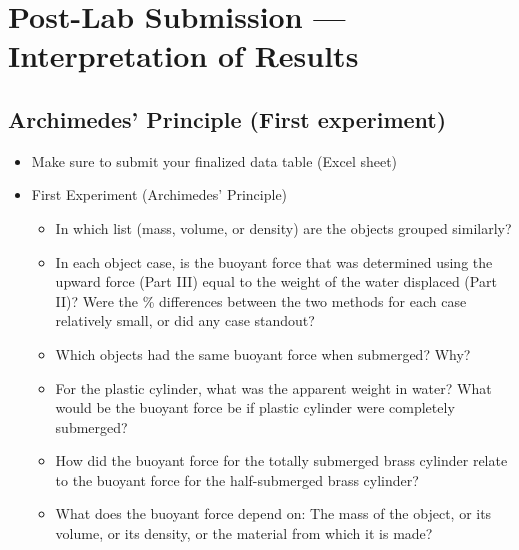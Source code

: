 
\section{Post-Lab Submission --- Interpretation of Results}

\subsection{Archimedes' Principle (First experiment)}
\begin{itemize}
\item Make sure to submit your finalized data table (Excel sheet)

    \item First Experiment (Archimedes' Principle)
\begin{itemize}
    \item In which list (mass, volume, or density) are the objects grouped similarly?
    \item In each object case, is the buoyant force that was determined using the upward force (Part III) equal to the
weight of the water displaced (Part II)? Were the \% differences between the two methods for each case relatively small, or did any case standout?
    \item Which objects had the same buoyant force when submerged? Why?
    \item For the plastic cylinder, what was the apparent weight in water? What would be the buoyant force be if plastic cylinder were completely submerged?
    \item How did the buoyant force for the totally submerged brass cylinder relate to the buoyant force for the half-submerged brass cylinder?
    \item What does the buoyant force depend on: The mass of the object, or its volume, or its density, or the material from which it is made?
\end{itemize}



\end{itemize}
